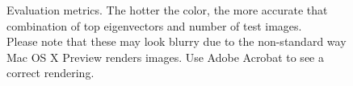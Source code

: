 \documentclass[11pt]{report}
\begin{document}
\begin{figure}[h]
  \centering
  \hfil

  \hfil
  \caption{Evaluation metrics. The hotter the color, the more accurate that combination of top eigenvectors and number of test images.\\ Please note that these may look blurry due to the non-standard way Mac OS X Preview renders images. Use Adobe Acrobat to see a correct rendering.}
  \label{fig:metrics}
\end{figure}
\end{document}

